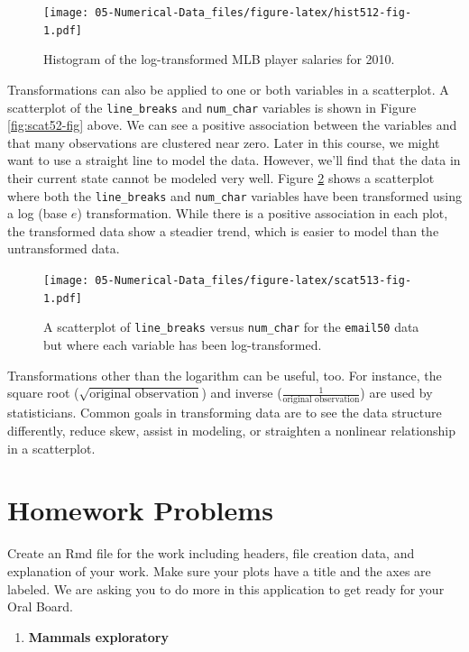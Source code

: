 \documentclass[
]{book}
\providecommand{\tightlist}{%
  \setlength{\itemsep}{0pt}\setlength{\parskip}{0pt}}
\begin{document}
\begin{figure}
\centering
\texttt{[image: 05-Numerical-Data\_files/figure-latex/hist512-fig-1.pdf]}
\caption{\label{fig:hist512-fig}Histogram of the log-transformed MLB player salaries for 2010.}
\end{figure}

Transformations can also be applied to one or both variables in a scatterplot. A scatterplot of the \texttt{line\_breaks} and \texttt{num\_char} variables is shown in Figure \ref{fig:scat52-fig} above. We can see a positive association between the variables and that many observations are clustered near zero. Later in this course, we might want to use a straight line to model the data. However, we'll find that the data in their current state cannot be modeled very well. Figure \ref{fig:scat513-fig} shows a scatterplot where both the \texttt{line\_breaks} and \texttt{num\_char} variables have been transformed using a log (base \(e\)) transformation. While there is a positive association in each plot, the transformed data show a steadier trend, which is easier to model than the untransformed data.

\begin{figure}
\centering
\texttt{[image: 05-Numerical-Data\_files/figure-latex/scat513-fig-1.pdf]}
\caption{\label{fig:scat513-fig}A scatterplot of \texttt{line\_breaks} versus \texttt{num\_char} for the \texttt{email50} data but where each variable has been log-transformed.}
\end{figure}

Transformations other than the logarithm can be useful, too. For instance, the square root (\(\sqrt{\text{original observation}}\)) and inverse (\(\frac{1}{\text{original observation}}\)) are used by statisticians. Common goals in transforming data are to see the data structure differently, reduce skew, assist in modeling, or straighten a nonlinear relationship in a scatterplot.

\hypertarget{homework-problems-4}{%
\section{Homework Problems}\label{homework-problems-4}}

Create an Rmd file for the work including headers, file creation data, and explanation of your work. Make sure your plots have a title and the axes are labeled. We are asking you to do more in this application to get ready for your Oral Board.

\begin{enumerate}
\def\labelenumi{\arabic{enumi}.}
\tightlist
\item
  \textbf{Mammals exploratory}
\end{enumerate}
\end{document}
